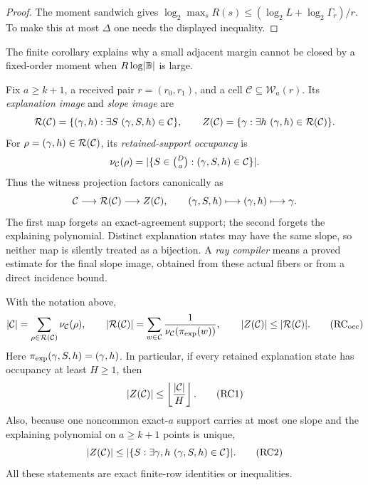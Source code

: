 \documentclass[11pt,a4paper]{amsart}
\numberwithin{equation}{section}
\theoremstyle{remark}
\newcommand{\Ccal}{\mathcal C}\newcommand{\Dcal}{\mathcal D}\newcommand{\Ecal}{\mathcal E}
\newcommand{\Wcal}{\mathcal W}\newcommand{\Xcal}{\mathcal X}\newcommand{\Ycal}{\mathcal Y}
\begin{document}
\begin{proof}
The moment sandwich gives \(\log_2\max_sR(s)\le(\log_2L+\log_2\Gamma_r)/r\).  To make this at most \(\Delta\) one needs the displayed inequality.
\end{proof}

The finite corollary explains why a small adjacent margin cannot be closed
by a fixed-order moment when \(R\log\lvert \mathbb B\rvert\) is large.

\begin{definition}
\label{def:explanation-occupancy}
Fix \(a\ge k+1\), a received pair \(r=(r_0,r_1)\), and a cell
\(\Ccal\subseteq\Wcal_a(r)\).  Its \emph{explanation image} and
\emph{slope image} are
\[
 \Rcal(\Ccal)=\{(\gamma,h):\exists S\ (\gamma,S,h)\in\Ccal\},
 \qquad Z(\Ccal)=\{\gamma:\exists h\ (\gamma,h)\in\Rcal(\Ccal)\}.
\]
For \(\rho=(\gamma,h)\in\Rcal(\Ccal)\), its
\emph{retained-support occupancy} is
\[
 \nu_{\Ccal}(\rho)
   =\abs{\{S\in\tbinom Da:(\gamma,S,h)\in\Ccal\}}.
\]
Thus the witness projection factors canonically as
\[
 \Ccal\longrightarrow\Rcal(\Ccal)\longrightarrow Z(\Ccal),
 \qquad (\gamma,S,h)\longmapsto(\gamma,h)\longmapsto\gamma.
\]
The first map forgets an exact-agreement support; the second forgets the
explaining polynomial.  Distinct explanation states may have the same
slope, so neither map is silently treated as a bijection.  A
\emph{ray compiler} means a proved estimate for the final slope image,
obtained from these actual fibers or from a direct incidence bound.
\end{definition}

\begin{lemma}
\label{lem:exact-occupancy-compiler}
With the notation above,
\[
 \abs{\Ccal}=\sum_{\rho\in\Rcal(\Ccal)}\nu_{\Ccal}(\rho),
 \qquad
 \abs{\Rcal(\Ccal)}
   =\sum_{w\in\Ccal}
       \frac1{\nu_{\Ccal}(\pi_{\rm exp}(w))},
 \qquad
 \abs{Z(\Ccal)}\le\abs{\Rcal(\Ccal)}.             \tag{RC$_{\rm occ}$}
\]
Here \(\pi_{\rm exp}(\gamma,S,h)=(\gamma,h)\).  In particular, if every
retained explanation state has occupancy at least \(H\ge1\), then
\[
        \abs{Z(\Ccal)}\le
        \floor{\frac{\abs{\Ccal}}H}.                \tag{RC1}
\]
Also, because one noncommon exact-\(a\) support carries at most one slope
and the explaining polynomial on \(a\ge k+1\) points is unique,
\[
 \abs{Z(\Ccal)}\le
 \abs{\{S:\exists\gamma,h\ (\gamma,S,h)\in\Ccal\}}. \tag{RC2}
\]
All these statements are exact finite-row identities or inequalities.
\end{lemma}
\end{document}
